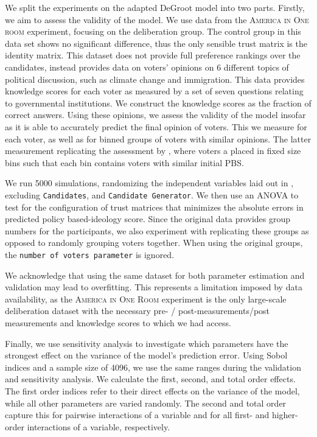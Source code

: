 We split the experiments on the adapted DeGroot model into two parts. Firstly,
we aim to assess the validity of the model. We use data from the
\textsc{America in One room} experiment, focusing on the deliberation group.
The control group in this data set shows no significant difference, thus the
only sensible trust matrix is the identity matrix. This dataset does not
provide full preference rankings over the candidates, instead provides data on
voters' opinions on 6 different topics of political discussion, such as climate
change and immigration. This data provides knowledge scores for each voter as
measured by a set of seven questions relating to governmental institutions. We
construct the knowledge scores as the fraction of correct answers. Using these
opinions, we assess the validity of the model insofar as it is able to
accurately predict the final opinion of voters. This we measure for each voter,
as well as for binned groups of voters with similar opinions. The latter
measurement replicating the assessment by
\citet{fishkinCanDeliberationHave2024}, where voters a placed in fixed size bins such that each bin contains voters with similar initial PBS.

We run 5000 simulations, randomizing the independent variables laid out in
, excluding \texttt{Candidates}, and
\texttt{Candidate Generator}. We then use an ANOVA to test for the
configuration of trust matrices that minimizes the absolute errors in predicted
policy based-ideology score. Since the original data provides group numbers for
the participants, we also experiment with
replicating these groups as opposed to randomly grouping voters together. When
using the original groups, the \texttt{number of voters parameter} is ignored.

We acknowledge that using the same dataset for both parameter estimation and
validation may lead to overfitting. This represents a limitation imposed by
data availability, as the \textsc{America in One Room} experiment is the only
large-scale deliberation dataset with the necessary pre- / post-measurements/post measurements and
knowledge scores to which we had access.





Finally, we use sensitivity analysis to investigate which parameters have the
strongest effect on the variance of the model's prediction error. Using Sobol
indices and a sample size of 4096, we use the same ranges during the validation and sensitivity analysis. We calculate the first, second, and total
order effects. The first order indices refer to their direct effects on the
variance of the model, while all other parameters are varied randomly. The second and
total order capture this for pairwise interactions of a variable and for all
first- and higher-order interactions of a variable, respectively.


